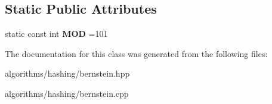 \subsection*{Static Public Attributes}
\begin{DoxyCompactItemize}
\item 
\hypertarget{classbernstein__hasher_a25a1b74eba73eef405ee6c2ced22e357}{static const int {\bfseries M\+O\+D} =101}\label{classbernstein__hasher_a25a1b74eba73eef405ee6c2ced22e357}

\end{DoxyCompactItemize}


The documentation for this class was generated from the following files\+:\begin{DoxyCompactItemize}
\item 
algorithms/hashing/bernstein.\+hpp\item 
algorithms/hashing/bernstein.\+cpp\end{DoxyCompactItemize}
